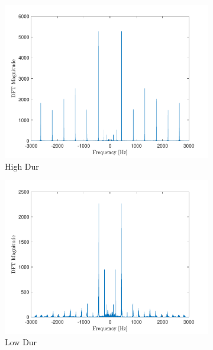 \documentclass[10pt]{article}
\begin{document}
\begin{figure}[ht]
    \centering
    \begin{subfigure}[b]{0.48\textwidth}
        \includegraphics[width=\textwidth]{problem7_a440_violin_spectra.pdf}
        \caption{High Dur}
    \end{subfigure}
    \quad
    \begin{subfigure}[b]{0.48\textwidth}
        \includegraphics[width=\textwidth]{problem7_a440_voice_spectra.pdf}
        \caption{Low Dur}
    \end{subfigure}
    \quad
    \begin{subfigure}[b]{0.48\textwidth}

\end{subfigure}
\end{figure}
\end{document}

